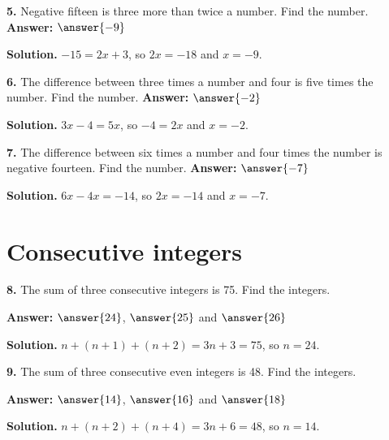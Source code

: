 \documentclass{ximera}
\begin{document}
\begin{problem}
\textbf{5.} Negative fifteen is three more than twice a number. Find the number.
\qquad \textbf{Answer:} $\answer{-9}$

\begin{hint}
\textbf{Solution.} $-15=2x+3$, so $2x=-18$ and $x=-9$.
\end{hint}
\end{problem}

\begin{problem}
\textbf{6.} The difference between three times a number and four is five times the number.
Find the number. \qquad \textbf{Answer:} $\answer{-2}$

\begin{hint}
\textbf{Solution.} $3x-4=5x$, so $-4=2x$ and $x=-2$.
\end{hint}
\end{problem}

\begin{problem}
\textbf{7.} The difference between six times a number and four times the number is
negative fourteen. Find the number. \qquad \textbf{Answer:} $\answer{-7}$

\begin{hint}
\textbf{Solution.} $6x-4x=-14$, so $2x=-14$ and $x=-7$.
\end{hint}
\end{problem}

\section*{Consecutive integers}

\begin{problem}
\textbf{8.} The sum of three consecutive integers is 75. Find the integers.

\textbf{Answer:} $\answer{24}$, $\answer{25}$ and $\answer{26}$

\begin{hint}
\textbf{Solution.} $n+(n+1)+(n+2)=3n+3=75$, so $n=24$.
\end{hint}
\end{problem}

\begin{problem}
\textbf{9.} The sum of three consecutive even integers is 48. Find the integers.

\textbf{Answer:} $\answer{14}$, $\answer{16}$ and $\answer{18}$

\begin{hint}
\textbf{Solution.} $n+(n+2)+(n+4)=3n+6=48$, so $n=14$.
\end{hint}
\end{problem}
\end{document}
